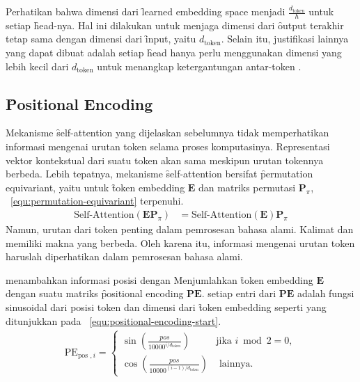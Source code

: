 	Perhatikan bahwa dimensi dari \f{learned embedding space} menjadi $\frac{d_{\text{token}}}{h}$ untuk setiap \f{head}-nya. Hal ini dilakukan untuk menjaga dimensi dari \f{output} terakhir tetap sama dengan dimensi dari \f{input}, yaitu $d_{\text{token}}$. Selain itu, justifikasi lainnya yang dapat dibuat adalah setiap \f{head} hanya perlu menggunakan dimensi yang lebih kecil dari $d_{\text{token}}$ untuk menangkap ketergantungan antar-token \citep{pi-tau2023transformer}.

	\subsection{\f{Positional Encoding}}
	\label{sec:positional-encoding}
	Mekanisme \f{self-attention} yang dijelaskan sebelumnya tidak memperhatikan informasi mengenai urutan token selama proses komputasinya. Representasi vektor kontekstual dari suatu token akan sama meskipun urutan tokennya berbeda. Lebih tepatnya, mekanisme \f{self-attention} bersifat \f{permutation equivariant}, yaitu untuk \f{token embedding} $\mathbf{E}$ dan matriks permutasi $\mathbf{P}_{\pi}$, \equ~\ref{equ:permutation-equivariant} terpenuhi.
	\begin{align}
	\label{equ:permutation-equivariant}
	\text{Self-Attention}(\mathbf{EP}_{\pi}) &= \text{Self-Attention}(\mathbf{E})\mathbf{P}_{\pi}
	\end{align}
	Namun, urutan dari token penting dalam pemrosesan bahasa alami. Kalimat  dan  memiliki makna yang berbeda. Oleh karena itu, informasi mengenai urutan token haruslah diperhatikan dalam pemrosesan bahasa alami.
	
	\cite{transformerori} menambahkan informasi posisi dengan Menjumlahkan \f{token embedding} $\mathbf{E}$ dengan suatu matriks \f{positional encoding} $\mathbf{PE}$. setiap entri dari $\mathbf{PE}$ adalah fungsi sinusoidal dari posisi token  dan dimensi dari \f{token embedding} seperti yang ditunjukkan pada \equ~\ref{equ:positional-encoding-start}.
	\begin{align}
		\label{equ:positional-encoding-start}
		\text{PE}_{ \text {pos }, i}= \begin{cases}\sin \left(\frac{p o s}{10000^{i / d_{\text {token}}}}\right) & \text {jika } i \bmod 2=0 ,\\ \cos \left(\frac{p o s}{10000^{(i-1) / d_{\text {token}}}}\right) & \text { lainnya. }\end{cases}
	\end{align}

